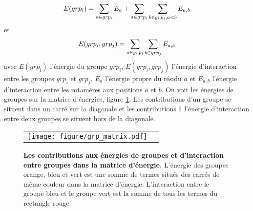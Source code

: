 \begin{equation}
E(grp_i) = \sum_{a \in grp_i}E_a + \sum_{a\in grp_i} \sum_{b\in grp_i, a < b}E_{a,b} \\
\end{equation}
et
\begin{equation}
E(grp_i,grp_j) = \sum_{a \in grp_i} \sum_{b \in grp_j} E_{a,b} \\
\end{equation}
avec $E(grp_i)$ l'énergie du groupe $grp_i$, $E(grp_i,grp_j)$ l'énergie d'interaction entre les groupes $grp_i$ et $grp_j$, $E_a$ l'énergie propre du résidu $a$ et $E_{a,b}$ l'énergie d'interaction entre les rotamères aux positions $a$ et $b$. On voit les énergies de groupes sur la matrice d'énergies, figure \ref{fig:matrix_grp}. Les contributions d'un groupe se situent dans un carré sur la diagonale et les contributions à l'énergie d'interaction entre deux groupes se situent hors de la diagonale.


   \begin{figure}[!htbp]
     \centering
     \begin{tabular}{cc}
       \texttt{[image: figure/grp\_matrix.pdf]} &
     \end{tabular}
     
     \caption{\textbf{Les contributions aux énergies de groupes et d'interaction entre groupes dans la matrice d'énergie.} L'énergie des groupes orange, bleu et vert est une somme de termes situés des carrés de même couleur dans la matrice d'énergie. L'interaction entre le groupe bleu et le groupe vert est la somme de tous les termes du rectangle rouge.}
\label{fig:matrix_grp}
   \end{figure}
   

